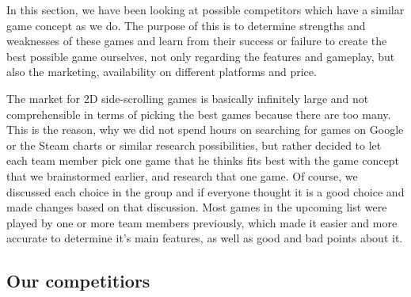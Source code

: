\documentclass[12p]{article}
\begin{document}



In this section, we have been looking at possible competitors which have a similar game concept as we do. The purpose of this is to determine strengths and weaknesses of these games and learn from their success or failure to create the best possible game ourselves, not only regarding the features and gameplay, but also the marketing, availability on different platforms and price.

The market for 2D side-scrolling games is basically infinitely large and not comprehensible in terms of picking the best games because there are too many. This is the reason, why we did not spend hours on searching for games on Google or the Steam charts or similar research possibilities, but rather decided to let each team member pick one game that he thinks fits best with the game concept that we brainstormed earlier, and research that one game. Of course, we discussed each choice in the group and if everyone thought it is a good choice and made changes based on that discussion. Most games in the upcoming list were played by one or more team members previously, which made it easier and more accurate to determine it's main features, as well as good and bad points about it.


\newpage
\subsection{Our competitiors}
\end{document}
